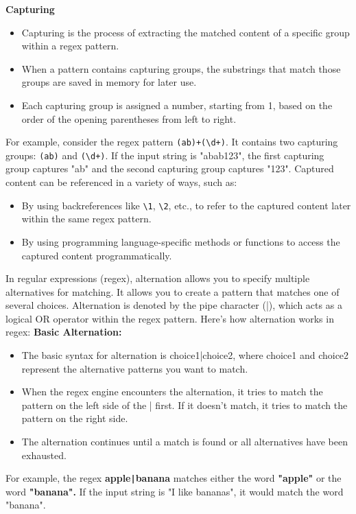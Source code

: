 \documentclass{report}
\begin{document}
    \bigbreak \noindent 
    \textbf{Capturing}
    \begin{itemize}
        \item Capturing is the process of extracting the matched content of a specific group within a regex pattern.
        \item When a pattern contains capturing groups, the substrings that match those groups are saved in memory for later use.
        \item Each capturing group is assigned a number, starting from 1, based on the order of the opening parentheses from left to right.
    \end{itemize}
    \bigbreak \noindent 
    For example, consider the regex pattern \texttt{(ab)+(\textbackslash d+)}. It contains two capturing groups: \texttt{(ab)} and \texttt{(\textbackslash d+)}. If the input string is "abab123", the first capturing group captures "ab" and the second capturing group captures "123".
    \bigbreak \noindent 
    Captured content can be referenced in a variety of ways, such as:
    \begin{itemize}
        \item By using backreferences like \texttt{\textbackslash 1}, \texttt{\textbackslash 2}, etc., to refer to the captured content later within the same regex pattern.
        \item By using programming language-specific methods or functions to access the captured content programmatically.
    \end{itemize}
    \bigbreak \noindent 


    \pagebreak
    \bigbreak
    \noindent

    In regular expressions (regex), alternation allows you to specify multiple alternatives for matching. It allows you to create a pattern that matches one of several choices. Alternation is denoted by the pipe character (|), which acts as a logical OR operator within the regex pattern.
    \bigbreak \noindent 
    Here's how alternation works in regex:
    \bigbreak \noindent 
    \textbf{Basic Alternation:}
    \begin{itemize}
        \item The basic syntax for alternation is choice1|choice2, where choice1 and choice2 represent the alternative patterns you want to match.
        \item When the regex engine encounters the alternation, it tries to match the pattern on the left side of the | first. If it doesn't match, it tries to match the pattern on the right side.
        \item The alternation continues until a match is found or all alternatives have been exhausted.
    \end{itemize}
    \bigbreak \noindent 
    For example, the regex \textbf{apple\texttt{|}banana} matches either the word \textbf{"apple"} or the word \textbf{"banana".} If the input string is "I like bananas", it would match the word "banana".
\end{document}
